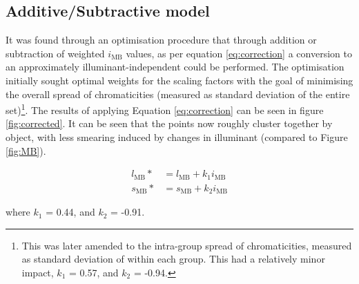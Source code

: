 


\subsection{Additive/Subtractive model}

It was found through an optimisation procedure that through addition or subtraction of weighted $i_{\text{MB}}$ values, as per equation \ref{eq:correction} a conversion to an approximately illuminant-independent could be performed. The optimisation initially sought optimal weights for the scaling factors with the goal of minimising the overall spread of chromaticities (measured as standard deviation of the entire set)\footnote{This was later amended to the intra-group spread of chromaticities, measured as standard deviation of within each group. This had a relatively minor impact, $k_{1}$ = 0.57, and $k_{2}$ = -0.94.}. The results of applying Equation \ref{eq:correction} can be seen in figure \ref{fig:corrected}. %
It can be seen that the points now roughly cluster together by object, with less smearing induced by changes in illuminant (compared to Figure \ref{fig:MB}).


\begin{subequations} \label{eq:correction}
\begin{align}
l_{\text{MB}}* &= l_{\text{MB}} + k_{1}i_{\text{MB}}\\ %
s_{\text{MB}}* &= s_{\text{MB}} + k_{2}i_{\text{MB}}
\end{align}
\end{subequations}

where $k_{1}$ = 0.44, and $k_{2}$ = -0.91.

